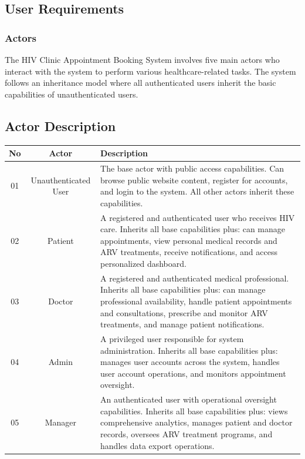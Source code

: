 \documentclass[12pt,a4paper]{article}
\begin{document}
\subsection{User Requirements}

\subsubsection{Actors}

The HIV Clinic Appointment Booking System involves five main actors who interact with the system to perform various healthcare-related tasks. The system follows an inheritance model where all authenticated users inherit the basic capabilities of unauthenticated users.

\subsection{Actor Description}

\begin{longtable}{|c||c|p{9cm}|}
\hline
\textbf{No} & \textbf{Actor} & \textbf{Description} \\
\hline
01 & Unauthenticated User & The base actor with public access capabilities. Can browse public website content, register for accounts, and login to the system. All other actors inherit these capabilities. \\
\hline
02 & Patient & A registered and authenticated user who receives HIV care. Inherits all base capabilities plus: can manage appointments, view personal medical records and ARV treatments, receive notifications, and access personalized dashboard. \\
\hline
03 & Doctor & A registered and authenticated medical professional. Inherits all base capabilities plus: can manage professional availability, handle patient appointments and consultations, prescribe and monitor ARV treatments, and manage patient notifications. \\
\hline
04 & Admin & A privileged user responsible for system administration. Inherits all base capabilities plus: manages user accounts across the system, handles user account operations, and monitors appointment oversight. \\
\hline
05 & Manager & An authenticated user with operational oversight capabilities. Inherits all base capabilities plus: views comprehensive analytics, manages patient and doctor records, oversees ARV treatment programs, and handles data export operations. \\
\hline
\end{longtable}
\end{document}
